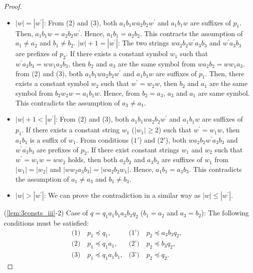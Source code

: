 \begin{proof}
\begin{itemize}
\item $|w|=|w^{\prime}|$: From (2) and (3), {\color{red}both }$a_{1}b_{1}wa_{2}b_{2}w^{\prime}$ and $a_{1}b_{1}w$ are suffixes of $p_{1}$.
Then, $a_{1}b_{1}w=a_{2}b_{2}w^{\prime}$.
Hence, $a_{1}b_{1}=a_{2}b_{2}$.
This contracts the assumption of $a_{1} \ne a_{2}$ and $b_{1} \ne b_{2}$.
%
$|w|+1=|w^{\prime}|$: The {\color{red} two} strings $wa_{2}b_{2}w^{\prime}a_{3}b_{3}$ and $w^{\prime}a_{3}b_{3}$ are prefixes of $p_{2}$.
If there exists a constant symbol $w_{1}$ such that $w^{\prime}a_{3}b_{3}=ww_{1}a_{3}b_{3}$,
then $b_{2}$ and $a_{3}$ are the same symbol from $wa_{2}b_{2}=ww_{1}a_{3}$.
from (2) and (3), {\color{red}both } $a_{1}b_{1}wa_{2}b_{2}w^{\prime}$ and $a_{1}b_{1}w$ are suffixes of $p_{1}$.
Then, there exists a constant symbol $w_{2}$ such that $w^{\prime}=w_{2}w$,
then $b_{2}$ and $a_{1}$ are the same symbol from $b_{2}w_{2}w=a_{1}b_{1}w$.
Hence, from $b_{2}=a_{3}$, $a_{3}$ and $a_{1}$ are same symbol.
This contradicts the assumption of $a_{3} \ne a_{1}$.
%
\item $|w|+1 < |w^{\prime}|$: From (2) and (3), 
{\color{red}both }$a_{1}b_{1}wa_{2}b_{2}w^{\prime}$ and $a_{1}b_{1}w$ are suffixes of $p_{1}$.
If there exists a constant string $w_{1}$ ($|w_{1}|\geq 2$) such that $w^{\prime}=w_{1}w$, then $a_{1}b_{1}$ is a suffix of $w_{1}$.
From  conditions ($1'$) and ($2'$), 
{\color{red}both }$wa_{2}b_{2}w^{\prime}a_{3}b_{3}$ and $w^{\prime}a_{3}b_{3}$ are prefixes of $p_{2}$.
If there exist constant strings $w_{1}$ and $w_{2}$ such that $w^{\prime} = w_{1}w=ww_{2}$ holds, then {\color{red}both }$a_{2}b_{2}$ and $a_{3}b_{3}$ are suffixes of $w_{1}$ from $|w_1|=|w_2|$ and $|ww_{2}a_{3}b_{3}|=|wa_{2}b_{2}w_{1}|$.
Hence, $a_{1}b_{1}=a_{3}b_{3}$.
This contradicts the assumption of $a_{1} \ne a_{3}$ and $b_{1} \ne b_{3}$.
%
\item $|w|>|w^{\prime}|$: We can prove the contradiction in a similar way as $|w|\le|w^{\prime}|$.
\end{itemize}

\smallskip

\noindent
(\ref{lem:3consts_iii}-2) Case of $q=q_{1}a_{1}b_{1}a_{3}b_{3}q_{2}$ ($b_{1}=a_{2}$ and $a_{3}=b_{2}$):
The following conditions must be satisfied:
\begin{align*}
\textrm{(1)}~& p_{1} \preceq q_{1}, & \textrm{(1')}~& p_{2} \preceq a_{3}b_{3}q_{2}, \\
\textrm{(2)}~& p_{1} \preceq q_{1}a_{1}, & \textrm{(2')}~& p_{2} \preceq b_{3}q_{2}, \\
\textrm{(3)}~& p_{1} \preceq q_{1}a_{1}b_{1}, & \textrm{(3')}~& p_{2} \preceq q_{2}.
\end{align*}


\end{proof}
